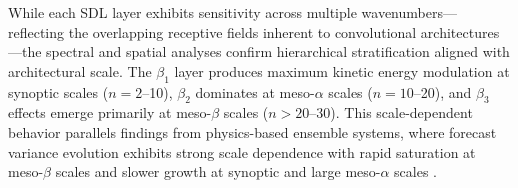 \documentclass{agujournal2019}
\begin{document}
While each SDL layer exhibits sensitivity across multiple wavenumbers—reflecting the overlapping receptive fields inherent to convolutional architectures—the spectral and spatial analyses confirm hierarchical stratification aligned with architectural scale. The $\beta_1$ layer produces maximum kinetic energy modulation at synoptic scales ($n=2$--10), $\beta_2$ dominates at meso-$\alpha$ scales ($n=10$--20), and $\beta_3$ effects emerge primarily at meso-$\beta$ scales ($n>20$--30). This scale-dependent behavior parallels findings from physics-based ensemble systems, where forecast variance evolution exhibits strong scale dependence with rapid saturation at meso-$\beta$ scales and slower growth at synoptic and large meso-$\alpha$ scales \cite{rodwell2025}.


\end{document}
